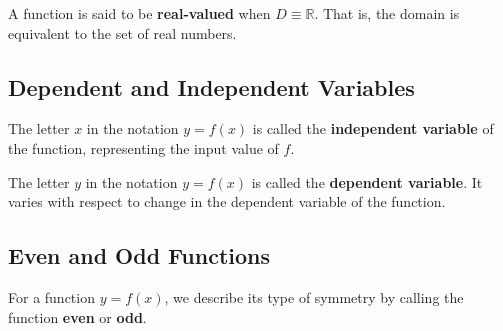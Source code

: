 \begin{defn}
  A function is said to be \textbf{real-valued} when \(D \equiv \mathbb{R}\). That is, the domain is equivalent to the set of real numbers.
\end{defn}


\subsection{Dependent and Independent Variables}
\begin{defn}
  The letter \(x\) in the notation \(y=f(x)\) is called the \textbf{independent variable} of the function, representing the input value of \(f\).
\end{defn}
\begin{defn}
  The letter \(y\) in the notation \(y=f(x)\) is called the \textbf{dependent variable}.
  It varies with respect to change in the dependent variable of the function.
\end{defn}

\subsection{Even and Odd Functions}

For a function $y=f(x)$, we describe its type of symmetry by calling the function \textbf{even} or \textbf{odd}.

